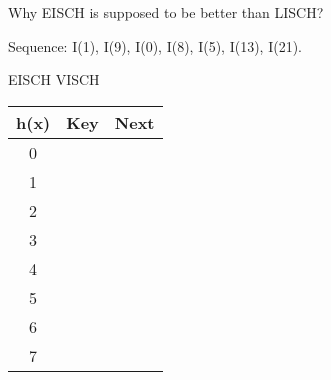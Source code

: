 Why EISCH is supposed to be better than LISCH?

Sequence: I(1), I(9), I(0), I(8), I(5), I(13), I(21).

\vspace{0.5cm}
EISCH \hspace{4.65cm} VISCH

\vspace{0.2cm}
\begin{tabular}{|c|c|c|}
\hline
h(x) & Key & Next \\ \hline\hline
0 & \hspace{3cm} & \hspace{1cm} \\ \hline
1 & \hspace{3cm} & \hspace{1cm} \\ \hline
2 & \hspace{3cm} & \hspace{1cm} \\ \hline
3 & \hspace{3cm} & \hspace{1cm} \\ \hline
4 & \hspace{3cm} & \hspace{1cm} \\ \hline
5 & \hspace{3cm} & \hspace{1cm} \\ \hline
6 & \hspace{3cm} & \hspace{1cm} \\ \hline
7 & \hspace{3cm} & \hspace{1cm} \\ \hline
\end{tabular}
